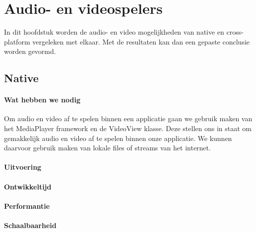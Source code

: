 
\chapter{Audio- en videospelers}%
\label{ch:audioenvideo}

In dit hoofdstuk worden de audio- en video mogelijkheden van native en cross-platform vergeleken met elkaar. 
Met de resultaten kan dan een gepaste conclusie worden gevormd.

\section{Native}
\subsubsection{Wat hebben we nodig}
Om audio en video af te spelen binnen een applicatie gaan we gebruik maken van het MediaPlayer 
framework en de VideoView klasse. Deze stellen ons in staat om gemakkelijk audio en video af te spelen binnen 
onze applicatie. We kunnen daarvoor gebruik maken van lokale files of streams van het internet.

\subsubsection{Uitvoering}



\subsubsection{Ontwikkeltijd}



\subsubsection{Performantie}



\subsubsection{Schaalbaarheid}




